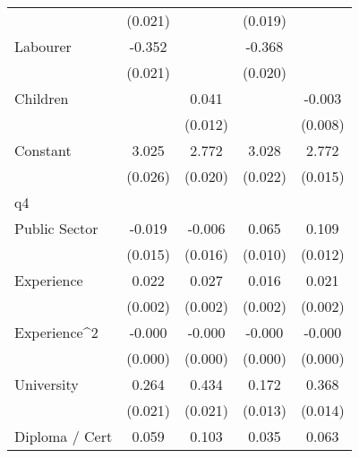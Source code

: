 {\begin{tabular}{l*{4}{c}}
                    &     (0.021)         &                     &     (0.019)         &                     \\
[1em]
Labourer            &      -0.352\sym{***}&                     &      -0.368\sym{***}&                     \\
                    &     (0.021)         &                     &     (0.020)         &                     \\
[1em]
Children            &                     &       0.041\sym{***}&                     &      -0.003         \\
                    &                     &     (0.012)         &                     &     (0.008)         \\
[1em]
Constant            &       3.025\sym{***}&       2.772\sym{***}&       3.028\sym{***}&       2.772\sym{***}\\
                    &     (0.026)         &     (0.020)         &     (0.022)         &     (0.015)         \\
\hline
q4                  &                     &                     &                     &                     \\
Public Sector       &      -0.019         &      -0.006         &       0.065\sym{***}&       0.109\sym{***}\\
                    &     (0.015)         &     (0.016)         &     (0.010)         &     (0.012)         \\
[1em]
Experience          &       0.022\sym{***}&       0.027\sym{***}&       0.016\sym{***}&       0.021\sym{***}\\
                    &     (0.002)         &     (0.002)         &     (0.002)         &     (0.002)         \\
[1em]
Experience^{2}      &      -0.000\sym{***}&      -0.000\sym{***}&      -0.000\sym{***}&      -0.000\sym{***}\\
                    &     (0.000)         &     (0.000)         &     (0.000)         &     (0.000)         \\
[1em]
University          &       0.264\sym{***}&       0.434\sym{***}&       0.172\sym{***}&       0.368\sym{***}\\
                    &     (0.021)         &     (0.021)         &     (0.013)         &     (0.014)         \\
[1em]
Diploma / Cert      &       0.059\sym{***}&       0.103\sym{***}&       0.035\sym{**} &       0.063\sym{***}\\

\end{tabular}}
